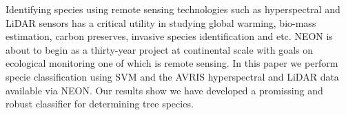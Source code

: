 \documentclass[remotesensing,article,accept,moreauthors,pdftex,12pt,a4paper]{mdpi}
\begin{document}
Identifying species using remote sensing technologies such as hyperspectral and LiDAR sensors has a critical utility in studying global warming, bio-mass estimation, carbon preserves, invasive species identification and etc. NEON is about to begin as a thirty-year project at continental scale with goals on ecological monitoring one of which is remote sensing. In this paper we perform specie classification using SVM and the AVRIS hyperspectral and LiDAR data available via NEON. Our results show we have developed a promissing and robust classifier for determining tree species. 











\end{document}
